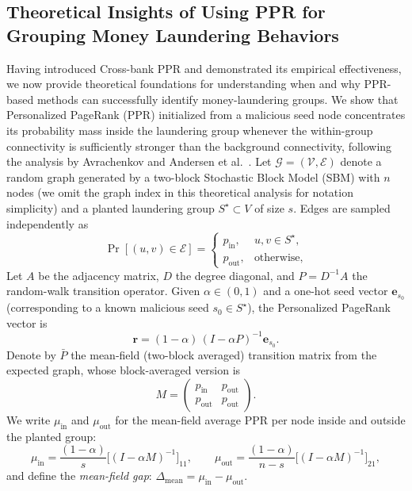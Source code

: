 \subsection{Theoretical Insights of Using PPR for Grouping Money Laundering Behaviors}
Having introduced Cross-bank PPR and demonstrated its empirical effectiveness, we now provide theoretical foundations for understanding when and why PPR-based methods can successfully identify money-laundering groups. We show that Personalized PageRank (PPR) initialized from a malicious seed node concentrates its probability mass inside the laundering group whenever the within-group connectivity is sufficiently stronger than the background connectivity, following the analysis by Avrachenkov and Andersen et al.~\parencite{avrachenkov2015pagerank, andersen2006local}. Let $\mathcal{G}=(\mathcal{V},\mathcal{E})$ denote a random graph  generated by a two-block Stochastic Block Model (SBM) with $n$ nodes (we omit the graph index in this theoretical analysis for notation simplicity) and a planted laundering group $S^\star\subset V$ of size $s$. Edges are sampled independently as
\begin{equation}
\Pr[(u,v)\in \mathcal{E}] =
    \begin{cases}
    p_{\mathrm{in}}, & u,v\in S^\star,\\[0.2em]
    p_{\mathrm{out}}, & \text{otherwise},
    \end{cases}
\end{equation}
Let $A$ be the adjacency matrix, $D$ the degree diagonal, and $P=D^{-1}A$ the random-walk transition operator. Given $\alpha\in(0,1)$ and a one-hot seed vector $\mathbf{e}_{s_0}$ (corresponding to a known malicious seed $s_0\in S^\star$), the Personalized PageRank vector is
\begin{equation}
    \mathbf{r} =(1-\alpha)\,(I-\alpha P)^{-1}\mathbf{e}_{s_0}.
\end{equation}
Denote by $\bar P$ the mean-field (two-block averaged) transition matrix from the expected graph, whose block-averaged version is
\begin{equation}
    M =
    \begin{pmatrix}
        p_{\mathrm{in}} & p_{\mathrm{out}}\\
        p_{\mathrm{out}} & p_{\mathrm{out}}
    \end{pmatrix}.
\end{equation}
We write $\mu_{\mathrm{in}}$ and $\mu_{\mathrm{out}}$ for the mean-field average PPR per node inside and outside the planted group:
\begin{equation}
    \label{mu_in_and_out}
    \mu_{\mathrm{in}} =\frac{(1-\alpha)}{s}\big[(I-\alpha M)^{-1}\big]_{11}, \qquad
    \mu_{\mathrm{out}} =\frac{(1-\alpha)}{n-s}\big[(I-\alpha M)^{-1}\big]_{21},
\end{equation}
and define the \emph{mean-field gap}: $\Delta_{\mathrm{mean}}=\mu_{\mathrm{in}}-\mu_{\mathrm{out}}$.





